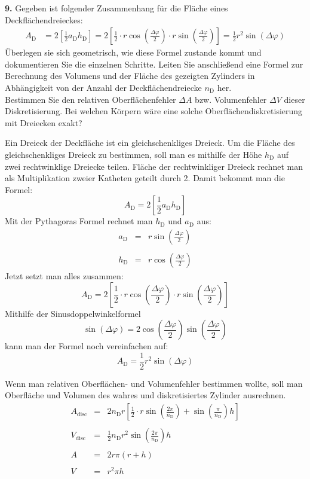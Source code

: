 \documentclass[Protokollheft.tex]{subfiles}
\begin{document}
    \begin{framed}
	\noindent \textbf{9.} Gegeben ist folgender Zusammenhang für die Fläche eines Deckflächendreieckes:
        \begin{align}
        A_\text{D} &= 2 \left[\frac12 a_\text{D} h_\text{D}\right] = 2 \left[ \frac12 \cdot r \cos\left(\frac{\Delta \varphi}{2}\right)\cdot r \sin\left(\frac{\Delta \varphi}{2}\right)  \right] = \frac12 r^2 \sin(\Delta\varphi)
        \end{align}
        Überlegen sie sich geometrisch, wie diese Formel zustande kommt und dokumentieren Sie die einzelnen Schritte. Leiten Sie anschließend eine Formel zur Berechnung des Volumens und der Fläche des gezeigten Zylinders in Abhängigkeit von der Anzahl der Deckflächendreiecke $n_\mathrm{D}$ her.\\
        Bestimmen Sie den relativen Oberflächenfehler $\Delta A$ bzw. Volumenfehler $\Delta V$ dieser Diskretisierung.
        Bei welchen Körpern wäre eine solche Oberflächendiskretisierung mit Dreiecken exakt?\label{exer:deltaAdeltaV}
\end{framed}

Ein Dreieck der Deckfläche ist ein gleichschenkliges Dreieck. Um die Fläche des gleichschenkliges Dreieck zu bestimmen, soll man es mithilfe der Höhe  $h_\text{D}$ auf zwei rechtwinklige Dreiecke teilen. Fläche der rechtwinkliger Dreieck rechnet man als Multiplikation zweier Katheten geteilt durch 2. Damit bekommt man die Formel: 
$$ A_\text{D} = 2 \left[\frac12 a_\text{D} h_\text{D}\right]$$
Mit der Pythagoras Formel rechnet man  $h_\text{D}$ und $a_\text{D}$ aus:
\begin{eqnarray*}
	a_\text{D}&=&r \sin\left(\frac{\Delta \varphi}{2}\right)\\
	\\
	h_\text{D}&=&r \cos\left(\frac{\Delta \varphi}{2}\right)
\end{eqnarray*}
Jetzt setzt man alles zusammen:
 $$A_\text{D} = 2 \left[ \frac12 \cdot r \cos\left(\frac{\Delta \varphi}{2}\right)\cdot r \sin\left(\frac{\Delta \varphi}{2}\right)  \right]$$
 Mithilfe der Sinusdoppelwinkelformel
 $$  \sin(\Delta\varphi)=2 \cos\left(\frac{\Delta \varphi}{2}\right) \sin\left(\frac{\Delta \varphi}{2}\right)  $$
 kann man der Formel noch vereinfachen auf:
  $$A_\text{D} =  \frac12 r^2 \sin(\Delta\varphi)$$
  
  Wenn man relativen Oberflächen- und Volumenfehler bestimmen wollte, soll man Oberfläche und Volumen des wahres und diskretisiertes Zylinder ausrechnen.
  \begin{eqnarray*}
  	A_\text{disc}&=&2n_\text{D}r\left[ \frac12 \cdot r \sin\left(\frac{2 \pi}{n_\text{D}}\right)+ \sin\left(\frac{\pi}{n_\text{D}}\right)h  \right]\\
  	\\
  	V_\text{disc}&=&\frac12 n_\text{D} r^2 \sin\left(\frac{ 2\pi}{n_\text{D}}\right)h\\
  	\\
  	A&=&2 r \pi (r+h)\\
  	\\
  	V&=&r^2\pi h
  \end{eqnarray*}
  
\end{document}
